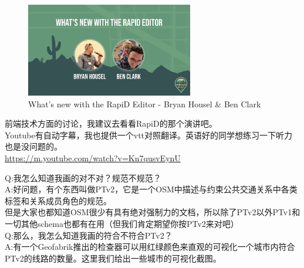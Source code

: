 \documentclass{beamer}
\begin{document}
\begin{frame}
    \begin{figure}[H]
        \centering
        \includegraphics[width=0.65\textwidth]{figure/youtube-Kn7qusvEynU.jpg}
        \caption{What's new with the RapiD Editor - Bryan Housel \& Ben Clark}
    \end{figure}

    \quad \quad 前端技术方面的讨论，我建议去看看RapiD的那个演讲吧。\\
    \quad \quad Youtube有自动字幕，我也提供一个vtt对照翻译。英语好的同学想练习一下听力也是没问题的。 \\
    \quad \quad \url{https://m.youtube.com/watch?v=Kn7qusvEynU}
\end{frame}

\begin{frame}
    Q:我怎么知道我画的对不对？规范不规范？\\

    A:好问题，有个东西叫做PTv2，它是一个OSM中描述与约束公共交通关系中各类标签和关系成员角色的规范。\\
    但是大家也都知道OSM很少有具有绝对强制力的文档，所以除了PTv2以外PTv1和一切其他schema也都有在用（但我们肯定期望你按PTv2来对吧）\\

    Q:那么，我怎么知道我画的符合不符合PTv2？\\

    A:有一个Geofabrik推出的检查器可以用红绿颜色来直观的可视化一个城市内符合PTv2的线路的数量。这里我们给出一些城市的可视化截图。
\end{frame}
\end{document}
